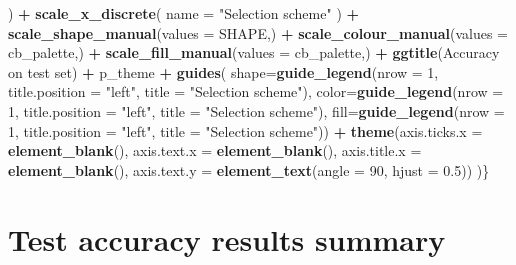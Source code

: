 \documentclass[
]{book}
\newenvironment{Shaded}{\begin{snugshade}}{\end{snugshade}}
\newcommand{\AttributeTok}[1]{\textcolor[rgb]{0.13,0.29,0.53}{#1}}
\newcommand{\DecValTok}[1]{\textcolor[rgb]{0.00,0.00,0.81}{#1}}
\newcommand{\FloatTok}[1]{\textcolor[rgb]{0.00,0.00,0.81}{#1}}
\newcommand{\FunctionTok}[1]{\textcolor[rgb]{0.13,0.29,0.53}{\textbf{#1}}}
\newcommand{\NormalTok}[1]{#1}
\newcommand{\SpecialCharTok}[1]{\textcolor[rgb]{0.81,0.36,0.00}{\textbf{#1}}}
\newcommand{\StringTok}[1]{\textcolor[rgb]{0.31,0.60,0.02}{#1}}
\begin{document}
\begin{Shaded}
\begin{Highlighting}[]
\NormalTok{    ) }\SpecialCharTok{+}
    \FunctionTok{scale\_x\_discrete}\NormalTok{(}
    \AttributeTok{name =} \StringTok{"Selection scheme"}
\NormalTok{    ) }\SpecialCharTok{+}
    \FunctionTok{scale\_shape\_manual}\NormalTok{(}\AttributeTok{values =}\NormalTok{ SHAPE,) }\SpecialCharTok{+}
    \FunctionTok{scale\_colour\_manual}\NormalTok{(}\AttributeTok{values =}\NormalTok{ cb\_palette,) }\SpecialCharTok{+}
    \FunctionTok{scale\_fill\_manual}\NormalTok{(}\AttributeTok{values =}\NormalTok{ cb\_palette,) }\SpecialCharTok{+}
    \FunctionTok{ggtitle}\NormalTok{(}\StringTok{\textquotesingle{}Accuracy on test set\textquotesingle{}}\NormalTok{) }\SpecialCharTok{+}
\NormalTok{    p\_theme }\SpecialCharTok{+}
    \FunctionTok{guides}\NormalTok{(}
    \AttributeTok{shape=}\FunctionTok{guide\_legend}\NormalTok{(}\AttributeTok{nrow =} \DecValTok{1}\NormalTok{, }\AttributeTok{title.position =} \StringTok{"left"}\NormalTok{,}
                        \AttributeTok{title =} \StringTok{"Selection scheme"}\NormalTok{),}
    \AttributeTok{color=}\FunctionTok{guide\_legend}\NormalTok{(}\AttributeTok{nrow =} \DecValTok{1}\NormalTok{, }\AttributeTok{title.position =} \StringTok{"left"}\NormalTok{,}
                        \AttributeTok{title =} \StringTok{"Selection scheme"}\NormalTok{),}
    \AttributeTok{fill=}\FunctionTok{guide\_legend}\NormalTok{(}\AttributeTok{nrow =} \DecValTok{1}\NormalTok{, }\AttributeTok{title.position =} \StringTok{"left"}\NormalTok{,}
                        \AttributeTok{title =} \StringTok{"Selection scheme"}\NormalTok{)) }\SpecialCharTok{+}
    \FunctionTok{theme}\NormalTok{(}\AttributeTok{axis.ticks.x =} \FunctionTok{element\_blank}\NormalTok{(),}
            \AttributeTok{axis.text.x =} \FunctionTok{element\_blank}\NormalTok{(),}
            \AttributeTok{axis.title.x =} \FunctionTok{element\_blank}\NormalTok{(),}
            \AttributeTok{axis.text.y =} \FunctionTok{element\_text}\NormalTok{(}\AttributeTok{angle =} \DecValTok{90}\NormalTok{, }\AttributeTok{hjust =} \FloatTok{0.5}\NormalTok{))}
\NormalTok{)\}}
\end{Highlighting}
\end{Shaded}

\hypertarget{test-accuracy-results-summary}{%
\section{Test accuracy results summary}\label{test-accuracy-results-summary}}
\end{document}

